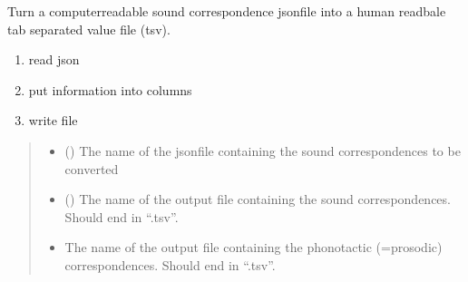 \documentclass[letterpaper,10pt,english]{sphinxmanual}
\begin{document}
\begin{fulllineitems}
\label{\detokenize{documentation:loanpy.utils.scjson2tsv}}
\pysigstartsignatures
{}
\pysigstopsignatures
\sphinxAtStartPar
Turn a computer\sphinxhyphen{}readable sound correspondence json\sphinxhyphen{}file into a
human readbale tab separated value file (tsv).
\begin{enumerate}
%
\item {} 
\sphinxAtStartPar
read json

\item {} 
\sphinxAtStartPar
put information into columns

\item {} 
\sphinxAtStartPar
write file

\end{enumerate}
\begin{quote}\begin{description}
\begin{itemize}
\item {} 
\sphinxAtStartPar
{} () \textendash{} The name of the json\sphinxhyphen{}file containing the sound
correspondences to be converted

\item {} 
\sphinxAtStartPar
{} () \textendash{} The name of the output file containing the sound
correspondences. Should end in “.tsv”.

\item {} 
\sphinxAtStartPar
{} \textendash{} The name of the output file containing the
phonotactic (=prosodic) correspondences. Should end in
“.tsv”.


\end{itemize}
\end{description}
\end{quote}
\end{fulllineitems}
\end{document}
